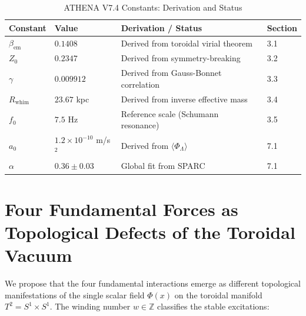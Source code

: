 \documentclass[12pt, a4paper]{article}
\begin{document}
\begin{table}[htbp]
\centering
\caption{ATHENA V7.4 Constants: Derivation and Status}
\label{tab:constants}
\begin{tabular}{llll}
\toprule
\textbf{Constant} & \textbf{Value} & \textbf{Derivation / Status} & \textbf{Section} \\
\midrule
$\beta_{\mathrm{em}}$ & $0.1408$ & Derived from toroidal virial theorem & 3.1 \\
$Z_0$ & $0.2347$ & Derived from symmetry-breaking & 3.2 \\
$\gamma$ & $0.009912$ & Derived from Gauss-Bonnet correlation & 3.3 \\
$R_{\mathrm{whim}}$ & $23.67$ kpc & Derived from inverse effective mass & 3.4 \\
$f_0$ & $7.5$ Hz & Reference scale (Schumann resonance) & 3.5 \\
$a_0$ & $1.2\times10^{-10}$ m/s$^2$ & Derived from $\langle\Phi_\Lambda\rangle$ & 7.1 \\
$\alpha$ & $0.36\pm0.03$ & Global fit from SPARC & 7.1 \\
\bottomrule
\end{tabular}
\end{table}

\section{Four Fundamental Forces as Topological Defects of the Toroidal Vacuum}
\label{sec:forces}

We propose that the four fundamental interactions emerge as different topological manifestations of the single scalar field $\Phi(x)$ on the toroidal manifold $T^2 = S^1 \times S^1$. The winding number $w \in \mathbb{Z}$ classifies the stable excitations:
\end{document}
